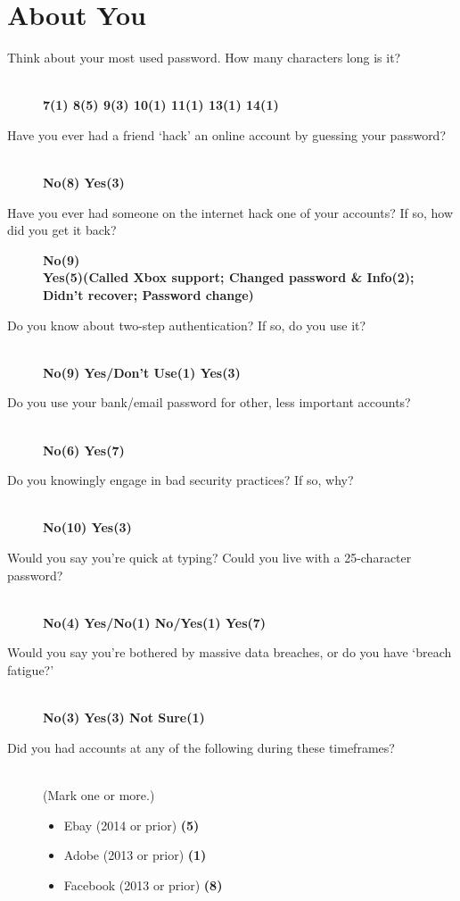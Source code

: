 \documentclass{article}
\begin{document}
  \section{About You}
    \begin{description}
      \item[Think about your most used password. How many characters long is it?] \mbox{}\\  \textbf{7(1) 8(5) 9(3) 10(1) 11(1) 13(1) 14(1)}
      \item[Have you ever had a friend `hack' an online account by guessing your password?] \mbox{}\\  \textbf{No(8) Yes(3)}
      \item[Have you ever had someone on the internet hack one of your accounts? If so, how did you get it back?]  \textbf{No(9)} \\ \textbf{Yes(5)(Called Xbox support; Changed password \& Info(2); Didn't recover; Password change)}
      \item[Do you know about two-step authentication? If so, do you use it?] \mbox{}\\ \textbf{No(9) Yes/Don't Use(1) Yes(3)}
      \item[Do you use your bank/email password for other, less important accounts?] \mbox{}\\ \textbf{No(6) Yes(7)}
      \item[Do you knowingly engage in bad security practices? If so, why?] \mbox{}\\ \textbf{No(10) Yes(3)}
      \item[Would you say you're quick at typing? Could you live with a 25-character password?] \mbox{}\\ \textbf{No(4) Yes/No(1) No/Yes(1) Yes(7)}
      \item[Would you say you're bothered by massive data breaches, or do you have `breach fatigue?'] \mbox{}\\ \textbf{No(3) Yes(3) Not Sure(1)}
      \item[Did you had accounts at any of the following during these timeframes?]
        \mbox{}\\ {\small (Mark one or more.)}
        \begin{itemize}
          \renewcommand{\labelitemi}{\scriptsize$\circ$}
          \item Ebay (2014 or prior) \textbf{(5)}
          \item Adobe (2013 or prior) \textbf{(1)}
          \item Facebook (2013 or prior) \textbf{(8)}

\end{itemize}
\end{description}
\end{document}
